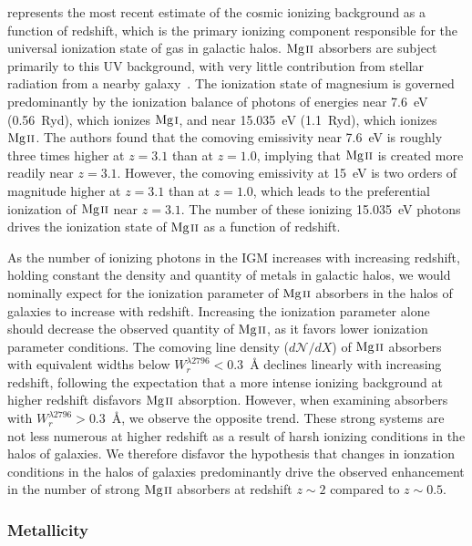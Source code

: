 \cite{Haardt2012} represents the most recent estimate of the cosmic ionizing background as a function of redshift, which is the primary ionizing component responsible for the universal ionization state of gas in galactic halos. ${\hbox{{\rm Mg}\kern 0.1em{\sc ii}}}$ absorbers are subject primarily to this UV background, with very little contribution from stellar radiation from a nearby galaxy~\citep{Churchill1999,Charlton2000,Rigby2002}. The ionization state of magnesium is governed predominantly by the ionization balance of photons of energies near 7.6~eV (0.56~Ryd), which ionizes ${\hbox{{\rm Mg}\kern 0.1em{\sc i}}}$, and near 15.035~eV (1.1~Ryd), which ionizes ${\hbox{{\rm Mg}\kern 0.1em{\sc ii}}}$. The authors found that the comoving emissivity near 7.6~eV is roughly three times higher at $z = 3.1$ than at $z = 1.0$, implying that ${\hbox{{\rm Mg}\kern 0.1em{\sc ii}}}$ is created more readily near $z = 3.1$. However, the comoving emissivity at 15~eV is two orders of magnitude higher at $z = 3.1$ than at $z = 1.0$, which leads to the preferential ionization of ${\hbox{{\rm Mg}\kern 0.1em{\sc ii}}}$ near $z = 3.1$. The number of these ionizing 15.035~eV photons drives the ionization state of ${\hbox{{\rm Mg}\kern 0.1em{\sc ii}}}$ as a function of redshift.

As the number of ionizing photons in the IGM increases with increasing redshift, holding constant the density and quantity of metals in galactic halos, we would nominally expect for the ionization parameter of ${\hbox{{\rm Mg}\kern 0.1em{\sc ii}}}$ absorbers in the halos of galaxies to increase with redshift. Increasing the ionization parameter alone should decrease the observed quantity of ${\hbox{{\rm Mg}\kern 0.1em{\sc ii}}}$, as it favors lower ionization parameter conditions. The comoving line density ($d\mathcal{N}\!/dX$) of ${\hbox{{\rm Mg}\kern 0.1em{\sc ii}}}$ absorbers with equivalent widths below $W_r^{\lambda2796} < 0.3$~{\AA} declines linearly with increasing redshift, following the expectation that a more intense ionizing background at higher redshift disfavors ${\hbox{{\rm Mg}\kern 0.1em{\sc ii}}}$ absorption. However, when examining absorbers with $W_r^{\lambda2796} > 0.3$~{\AA}, we observe the opposite trend. These strong systems are not less numerous at higher redshift as a result of harsh ionizing conditions in the halos of galaxies. We therefore disfavor the hypothesis that changes in ionzation conditions in the halos of galaxies predominantly drive the observed enhancement in the number of strong ${\hbox{{\rm Mg}\kern 0.1em{\sc ii}}}$ absorbers at redshift $z \sim 2$ compared to $z \sim 0.5$.


\subsubsection{Metallicity}
\label{ch5:metallicity}

